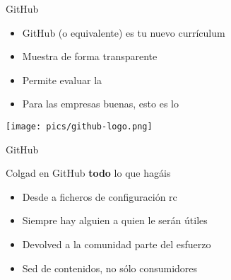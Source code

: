 \documentclass[14pt]{beamer}
\begin{document}
\begin{frame}{GitHub}
  \begin{itemize}
    \item GitHub (o equivalente) es tu nuevo currículum
    \item Muestra de forma transparente 
    \item Permite evaluar la 
    \item Para las empresas buenas, esto es lo 
  \end{itemize}

  \begin{center}
    \texttt{[image: pics/github-logo.png]}
  \end{center}
\end{frame}

\begin{frame}{GitHub}

  \begin{block}{\scriptsize} \centering
    \Large Colgad en GitHub {\bf todo} lo que hagáis
  \end{block}

  \begin{itemize}
    \item Desde  a ficheros de configuración rc
    \item Siempre hay alguien a quien le serán útiles
    \item Devolved a la comunidad parte del esfuerzo
    \item Sed  de contenidos, no sólo consumidores
  \end{itemize}

\end{frame}
\end{document}
